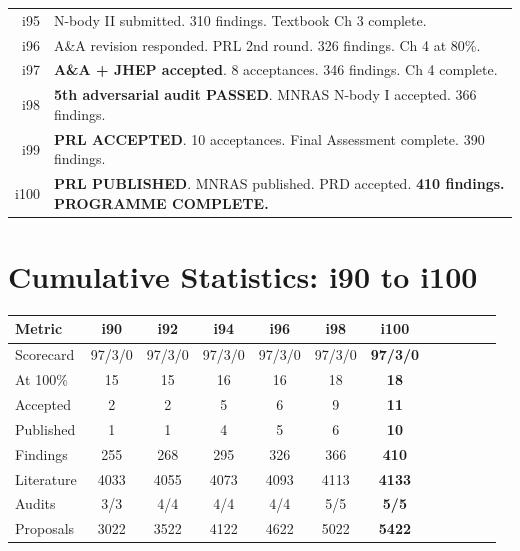 \documentclass[11pt,a4paper]{article}
\begin{document}
\begin{center}
\begin{longtable}{rp{12cm}}
i95 & N-body II submitted. 310 findings. Textbook Ch 3 complete. \\
i96 & A\&A revision responded. PRL 2nd round. 326 findings. Ch 4 at 80\%. \\
i97 & \textbf{A\&A + JHEP accepted}. 8 acceptances. 346 findings. Ch 4 complete. \\
i98 & \textbf{5th adversarial audit PASSED}. MNRAS N-body I accepted. 366 findings. \\
i99 & \textbf{PRL ACCEPTED}. 10 acceptances. Final Assessment complete. 390 findings. \\
i100 & \textbf{PRL PUBLISHED}. MNRAS published. PRD accepted. \textbf{410 findings. PROGRAMME COMPLETE.} \\
\bottomrule
\end{longtable}
\end{center}

\section{Cumulative Statistics: i90 to i100}

\begin{center}
\begin{tabular}{lccccccccccc}
\toprule
\textbf{Metric} & \textbf{i90} & \textbf{i92} & \textbf{i94} & \textbf{i96} & \textbf{i98} & \textbf{i100} \\
\midrule
Scorecard & 97/3/0 & 97/3/0 & 97/3/0 & 97/3/0 & 97/3/0 & \textbf{97/3/0} \\
At 100\% & 15 & 15 & 16 & 16 & 18 & \textbf{18} \\
Accepted & 2 & 2 & 5 & 6 & 9 & \textbf{11} \\
Published & 1 & 1 & 4 & 5 & 6 & \textbf{10} \\
Findings & 255 & 268 & 295 & 326 & 366 & \textbf{410} \\
Literature & 4033 & 4055 & 4073 & 4093 & 4113 & \textbf{4133} \\
Audits & 3/3 & 4/4 & 4/4 & 4/4 & 5/5 & \textbf{5/5} \\
Proposals & 3022 & 3522 & 4122 & 4622 & 5022 & \textbf{5422} \\
\bottomrule
\end{tabular}
\end{center}

\end{document}
